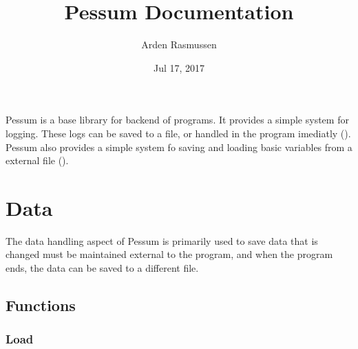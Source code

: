 \documentclass[letterpaper,10pt,english]{sphinxmanual}
\title{Pessum Documentation}
\date{Jul 17, 2017}
\author{Arden Rasmussen}
\begin{document}
\maketitle
\sphinxtableofcontents
{}\label{\detokenize{index::doc}}


Pessum is a base library for backend of programs. It provides a simple system
for logging. These logs can be saved to a file, or handled in the program
imediatly ({\hyperref[\detokenize{log::doc}]{}}). Pessum also provides a simple system fo saving and
loading basic variables from a external file ({\hyperref[\detokenize{data::doc}]{}}).


\chapter{Data}
\label{\detokenize{data::doc}}\label{\detokenize{data:pessum-documentation}}\label{\detokenize{data:data}}
The data handling aspect of Pessum is primarily used to save data that is
changed must be maintained external to the program, and when the program ends,
the data can be saved to a different file.


\section{Functions}
\label{\detokenize{data:functions}}

\subsection{Load}
\label{\detokenize{data:load}}
\end{document}
